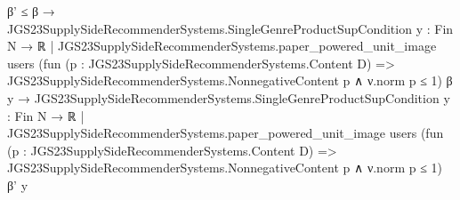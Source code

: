 \documentclass[10pt]{article}
\begin{document}
\begin{ReviewVerbatim}
                      β' ≤ β →
                        JGS23SupplySideRecommenderSystems.SingleGenreProductSupCondition
                            {y : Fin N → ℝ |
                              JGS23SupplySideRecommenderSystems.paper_powered_unit_image users
                                (fun (p : JGS23SupplySideRecommenderSystems.Content D) =>
                                  JGS23SupplySideRecommenderSystems.NonnegativeContent p ∧ ν.norm p ≤ 1)
                                β y} →
                          JGS23SupplySideRecommenderSystems.SingleGenreProductSupCondition
                            {y : Fin N → ℝ |
                              JGS23SupplySideRecommenderSystems.paper_powered_unit_image users
                                (fun (p : JGS23SupplySideRecommenderSystems.Content D) =>
                                  JGS23SupplySideRecommenderSystems.NonnegativeContent p ∧ ν.norm p ≤ 1)
                                β' y}
\end{ReviewVerbatim}
\end{document}
